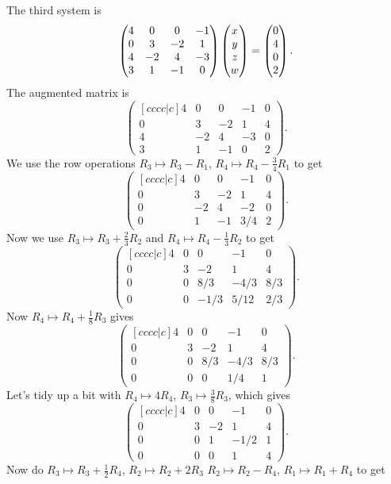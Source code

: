 \documentclass{article}
\begin{document}
\begin{Solution}
The third system is \[\begin{pmatrix} 4 & 0 & 0 & -1 \\ 0 & 3 & -2 & 1 \\ 4 & -2
& 4 & -3 \\ 3 & 1 & -1 & 0 \end{pmatrix}\begin{pmatrix} x \\y \\z \\w\end{pmatrix}=\begin{pmatrix} 0 \\ 4 \\ 0
\\ 2\end{pmatrix}.\] The augmented matrix is \[\begin{pmatrix}[cccc|c] 4 & 0 &
0 & -1 & 0 \\ 0 & 3 & -2 & 1 & 4 \\ 4 & -2 & 4 & -3 & 0 \\ 3 & 1 &
-1 & 0 &2 \end{pmatrix}.\] We use the row operations \(R_3\mapsto
R_3-R_1\), \(R_4\mapsto R_4-\frac{3}{4}R_1\) to get
\[\begin{pmatrix}[cccc|c] 4 & 0 & 0 & -1 & 0 \\ 0 & 3 & -2 & 1 & 4
\\ 0 & -2 & 4 & -2 & 0 \\ 0 & 1 & -1 & 3/4 & 2 \end{pmatrix}.\] Now
we use \(R_3\mapsto R_3+\frac{2}{3}R_2\) and \(R_4\mapsto
R_4-\frac{1}{3}R_2\) to get \[\begin{pmatrix}[cccc|c] 4 & 0 & 0 & -1
& 0 \\ 0 & 3 & -2 & 1 & 4 \\ 0 & 0 & 8/3 & -4/3 & 8/3 \\ 0 & 0 &
-1/3 & 5/12 & 2/3\end{pmatrix}.\] Now \(R_4\mapsto
R_4+\frac{1}{8}R_3\) gives \[\begin{pmatrix}[cccc|c] 4 & 0 & 0 & -1
& 0 \\ 0 & 3 & -2 & 1 & 4 \\ 0 & 0 & 8/3 & -4/3 & 8/3 \\ 0 & 0 & 0 &
1/4 & 1\end{pmatrix}.\] Let's tidy up a bit with \(R_4\mapsto
4R_4\), \(R_3\mapsto\frac{3}{8}R_3\), which gives
\[\begin{pmatrix}[cccc|c] 4 & 0 & 0 & -1 & 0 \\ 0 & 3 & -2 & 1 & 4
\\ 0 & 0 & 1 & -1/2 & 1 \\ 0 & 0 & 0 & 1 & 4\end{pmatrix}.\] Now do
\(R_3\mapsto R_3+\frac{1}{2}R_4\), \(R_2\mapsto R_2+2R_3\)
\(R_2\mapsto R_2-R_4\), \(R_1\mapsto R_1+R_4\) to get

\end{Solution}
\end{document}

